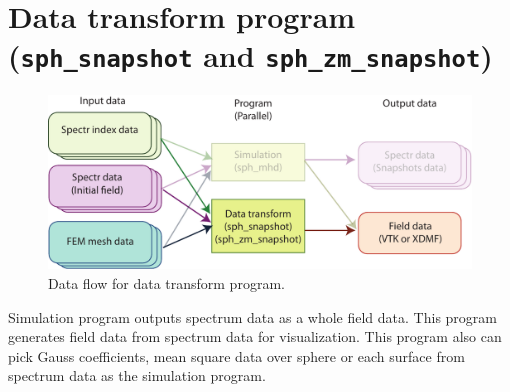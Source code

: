 \newpage
\section{Data transform program \\
({\tt sph\_snapshot} and {\tt sph\_zm\_snapshot})}
\label{section:assemble_sph}
%
\begin{figure}[htbp]
\begin{center}
\includegraphics*[width=130mm]{images/flow_3}
\end{center}
\caption{Data flow for data transform program.}
\label{fig:flow_3}
\end{figure}
%
Simulation program outputs spectrum data as a whole field data. This program generates field data from spectrum data for visualization. This program also can pick Gauss coefficients, mean square data over sphere or each surface from spectrum data as the simulation program.


